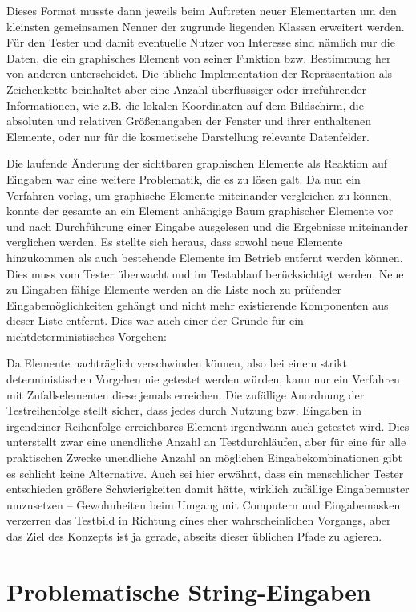Dieses Format musste dann jeweils beim Auftreten neuer Elementarten
um den kleinsten gemeinsamen Nenner der zugrunde liegenden Klassen
erweitert werden. Für den Tester und damit eventuelle Nutzer von
Interesse sind nämlich nur die Daten, die ein graphisches Element
von seiner Funktion bzw. Bestimmung her von anderen unterscheidet.
Die übliche Implementation der Repräsentation als Zeichenkette
beinhaltet aber eine Anzahl überflüssiger oder irreführender
Informationen, wie z.B. die lokalen Koordinaten auf dem Bildschirm,
die absoluten und relativen Größenangaben der Fenster und ihrer
enthaltenen Elemente, oder nur für die kosmetische Darstellung
relevante Datenfelder.

Die laufende Änderung der sichtbaren graphischen Elemente als Reaktion
auf Eingaben war eine weitere Problematik, die es zu lösen galt.
Da nun ein Verfahren vorlag, um graphische Elemente miteinander
vergleichen zu können, konnte der gesamte an ein Element anhängige Baum
graphischer Elemente vor und nach Durchführung einer Eingabe ausgelesen
und die Ergebnisse miteinander verglichen werden. Es stellte sich heraus,
dass sowohl neue Elemente hinzukommen als auch bestehende Elemente im
Betrieb entfernt werden können. Dies muss vom Tester überwacht und
im Testablauf berücksichtigt werden. Neue zu Eingaben fähige Elemente werden 
an die Liste noch zu prüfender Eingabemöglichkeiten gehängt und
nicht mehr existierende Komponenten aus dieser Liste entfernt. Dies war
auch einer der Gründe für ein nichtdeterministisches Vorgehen:

Da Elemente nachträglich verschwinden können, also bei einem strikt
deterministischen Vorgehen nie getestet werden würden, kann nur ein
Verfahren mit Zufallselementen diese jemals erreichen. Die zufällige
Anordnung der Testreihenfolge stellt sicher, dass jedes durch Nutzung 
bzw. Eingaben in irgendeiner Reihenfolge erreichbares Element
irgendwann auch getestet wird. Dies unterstellt zwar eine unendliche
Anzahl an Testdurchläufen, aber für eine für alle praktischen Zwecke
unendliche Anzahl an möglichen Eingabekombinationen gibt es schlicht
keine Alternative. Auch sei hier erwähnt, dass ein menschlicher Tester
entschieden größere Schwierigkeiten damit hätte, wirklich zufällige
Eingabemuster umzusetzen -- Gewohnheiten beim Umgang mit Computern
und Eingabemasken verzerren das Testbild in Richtung eines eher
wahrscheinlichen Vorgangs, aber das Ziel des Konzepts ist ja gerade,
abseits dieser üblichen Pfade zu agieren.


\section{Problematische String-Eingaben}\label{section:naughtystrings}

